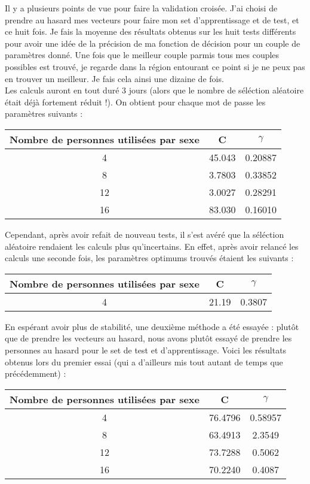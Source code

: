 \bigskip
Il y a plusieurs points de vue pour faire la validation croisée. J'ai choisi de prendre au hasard mes vecteurs pour faire mon set d'apprentissage et de test, et ce huit fois. Je fais la moyenne des résultats obtenus sur les huit tests différents pour avoir une idée de la précision de ma fonction de décision pour un couple de paramètres donné. Une fois que le meilleur couple parmis tous mes couples possibles est trouvé, je regarde dans la région entourant ce point si je ne peux pas en trouver un meilleur. Je fais cela ainsi une dizaine de fois.\\
Les calculs auront en tout duré 3 jours (alors que le nombre de séléction aléatoire était déjà fortement réduit !). On obtient pour chaque mot de passe les paramètres suivants :
\begin{center}\begin{tabular}{|c|c|c|}
\hline
Nombre de personnes utilisées par sexe & C & $\gamma$ \\
\hline
4 & 45.043 & 0.20887 \\
\hline
8 & 3.7803 & 0.33852 \\
\hline
12 & 3.0027 & 0.28291 \\
\hline
16 & 83.030 & 0.16010 \\
\hline
\end{tabular}\end{center}

Cependant, après avoir refait de nouveau tests, il s'est avéré que la séléction aléatoire rendaient les calculs plus qu'incertains. En effet, après avoir relancé les calculs une seconde fois, les paramètres optimums trouvés étaient les suivants :
\begin{center}\begin{tabular}{|c|c|c|}
\hline
Nombre de personnes utilisées par sexe & C & $\gamma$ \\
\hline
4 & 21.19 & 0.3807 \\
\hline
\end{tabular}\end{center}

\bigskip
En espérant avoir plus de stabilité, une deuxième méthode a été essayée : plutôt que de prendre les vecteurs au hasard, nous avons plutôt essayé de prendre les personnes au hasard pour le set de test et d'apprentissage. Voici les résultats obtenus lors du premier essai (qui a d'ailleurs mis tout autant de temps que précédemment) :
\begin{center}\begin{tabular}{|c|c|c|}
\hline
Nombre de personnes utilisées par sexe & C & $\gamma$ \\
\hline
4 & 76.4796 & 0.58957 \\
\hline
8 & 63.4913 & 2.3549 \\
\hline
12 & 73.7288 & 0.5062 \\
\hline
16 & 70.2240 & 0.4087 \\
\hline
\end{tabular}\end{center}

